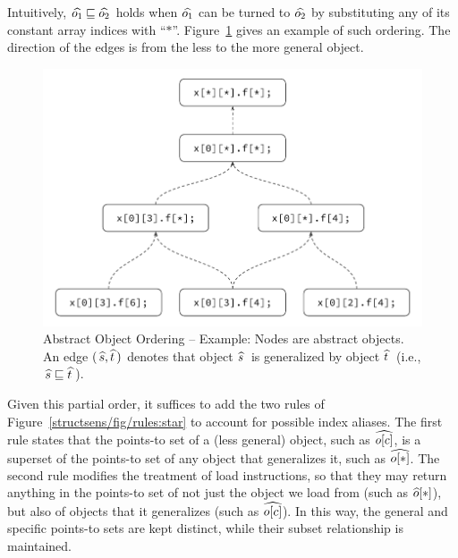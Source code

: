 \noindent
Intuitively, $\widehat{o_1} \sqsubseteq \widehat{o_2}$ holds when
$\widehat{o_1}$ can be turned to $\widehat{o_2}$ by substituting any of
its constant array indices with
``$*$''. Figure~\ref{structsens/fig/poset} gives an example of such
ordering. The direction of the edges is from the less to the more
general object.

\begin{figure}[ht]
  \centering
  \includegraphics[clip,width=0.80\linewidth]{figures/structsens/Partial-Order.pdf}
  \caption[Abstract Object Ordering]{%
    Abstract Object Ordering -- Example: Nodes are abstract
    objects. An edge $(\, \widehat{s},\widehat{t} \,)$ denotes that object
    $\widehat{s}\:$ is generalized by object $\widehat{t}\:$ (i.e.,
    $\, \widehat{s} \sqsubseteq \widehat{t}\, $).}
  \label{structsens/fig/poset}
\end{figure}

Given this partial order, it suffices to add the two rules of
Figure~\ref{structsens/fig/rules:star} to account for possible index
aliases. The first rule states that the points-to set of a (less
general) object, such as $\widehat{o[c]}$, is a superset of the
points-to set of any object that generalizes it, such as
$\widehat{o[*]}$. The second rule modifies the treatment of load
instructions, so that they may return anything in the points-to set of
not just the object we load from (such as $\widehat{o}[*]$), but also of
objects that it generalizes (such as $\widehat{o[c]}$). In this way, the
general and specific points-to sets are kept distinct, while their
subset relationship is maintained.

